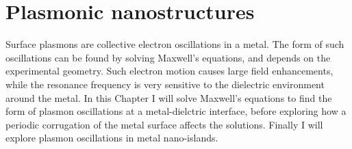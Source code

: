 
\chapter{Plasmonic nanostructures}

\graphicspath{{Chapter3/Figures/}}

Surface plasmons are collective electron oscillations in a metal. The form of such oscillations can be found by solving Maxwell's equations, and depends on the experimental geometry. Such electron motion causes large field enhancements, while the resonance frequency is very sensitive to the dielectric environment around the metal. In this Chapter I will solve Maxwell's equations to find the form of plasmon oscillations at a metal-dielctric interface, before exploring how a periodic corrugation of the metal surface affects the solutions. Finally I will explore plasmon oscillations in metal nano-islands.

